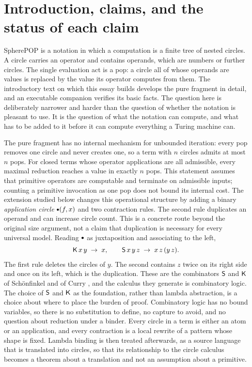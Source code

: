 \section{Introduction, claims, and the status of each claim}\label{sec:intro}

SpherePOP is a notation in which a computation is a finite tree of nested circles. A circle carries an operator and contains operands, which are numbers or further circles. The single evaluation act is a pop: a circle all of whose operands are values is replaced by the value its operator computes from them. The introductory text on which this essay builds develops the pure fragment in detail, and an executable companion verifies its basic facts. The question here is deliberately narrower and harder than the question of whether the notation is pleasant to use. It is the question of what the notation can compute, and what has to be added to it before it can compute everything a Turing machine can.

The pure fragment has no internal mechanism for unbounded iteration: every pop removes one circle and never creates one, so a term with $n$ circles admits at most $n$ pops. For closed terms whose operator applications are all admissible, every maximal reduction reaches a value in exactly $n$ pops. This statement assumes that primitive operators are computable and terminate on admissible inputs; counting a primitive invocation as one pop does not bound its internal cost. The extension studied below changes this operational structure by adding a binary \emph{application circle} $\App(f,x)$ and two contraction rules. The second rule duplicates an operand and can increase circle count. This is a concrete route beyond the original size argument, not a claim that duplication is necessary for every universal model. Reading $\App$ as juxtaposition and associating to the left,
\[
\mathsf{K}\,x\,y \;\rightarrow\; x,
\qquad
\mathsf{S}\,x\,y\,z \;\rightarrow\; x\,z\,(y\,z).
\]
The first rule deletes the circles of $y$. The second contains $z$ twice on its right side and once on its left, which is the duplication. These are the combinators $\mathsf{S}$ and $\mathsf{K}$ of Sch\"onfinkel and of Curry \cite{schonfinkel,curry-feys}, and the calculus they generate is combinatory logic. The choice of $\mathsf{S}$ and $\mathsf{K}$ as the foundation, rather than lambda abstraction, is a choice about where to place the burden of proof. Combinatory logic has no bound variables, so there is no substitution to define, no capture to avoid, and no question about reduction under a binder. Every circle in a term is either an atom or an application, and every contraction is a local rewrite of a pattern whose shape is fixed. Lambda binding is then treated afterwards, as a source language that is translated into circles, so that its relationship to the circle calculus becomes a theorem about a translation and not an assumption about a primitive.

